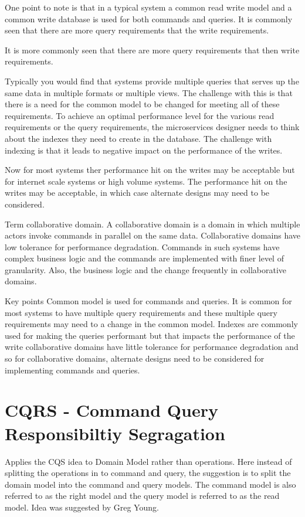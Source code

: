 One point to note is that in a typical system a common read write model and a common write database is used for both commands and queries.
It is commonly seen that there are more query requirements that the write requirements.

It is more commonly seen that there are more query requirements that then write requirements.

Typically you would find that systems provide multiple queries that serves up the same data in multiple formats or multiple views.
The challenge with this is that there is a need for the common model to be changed for meeting all of these requirements.
To achieve an optimal performance level for the various read requirements or the query requirements, the microservices designer needs to think about the indexes they need to create in the database.
The challenge with indexing is that it leads to negative impact on the performance of the writes.

Now for most systems ther performance hit on the writes may be acceptable but for internet scale systems or high volume systems.
The performance hit on the writes may be acceptable, in which case alternate designs may need to be considered.

Term collaborative domain.
A collaborative domain is a domain in which multiple actors invoke commands in parallel on the same data.
Collaborative domains have low tolerance for performance degradation.
Commands in such systems have complex business logic and the commands are implemented with finer level of granularity.
Also, the business logic and the change frequently in collaborative domains.

Key points
Common model is used for commands and queries.
It is common for most systems to have multiple query requirements and these multiple query requirements may need to a change in the common model.
Indexes are commonly used for making the queries performant but that impacts the performance of the write collaborative domains have little tolerance for performance degradation and so for collaborative domains, alternate designs need to be considered for implementing commands and queries.


\section{CQRS - Command Query Responsibiltiy Segragation}
Applies the CQS idea to Domain Model rather than operations.
Here instead of splitting the operations in to command and query, the suggestion is to split the domain model into the command and query models.
The command model is also referred to as the right model and the query model is referred to as the read model.
Idea was suggested by Greg Young.

